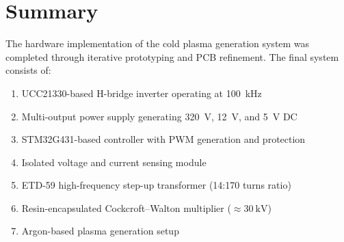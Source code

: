 \section{Summary}

The hardware implementation of the cold plasma generation system was completed through iterative prototyping and PCB refinement. The final system consists of:
\begin{enumerate}
    \item UCC21330-based H-bridge inverter operating at 100~kHz  
    \item Multi-output power supply generating 320~V, 12~V, and 5~V DC  
    \item STM32G431-based controller with PWM generation and protection  
    \item Isolated voltage and current sensing module  
    \item ETD-59 high-frequency step-up transformer (14:170 turns ratio)  
    \item Resin-encapsulated Cockcroft--Walton multiplier ($\approx 30~\text{kV}$)  
    \item Argon-based plasma generation setup  
\end{enumerate}